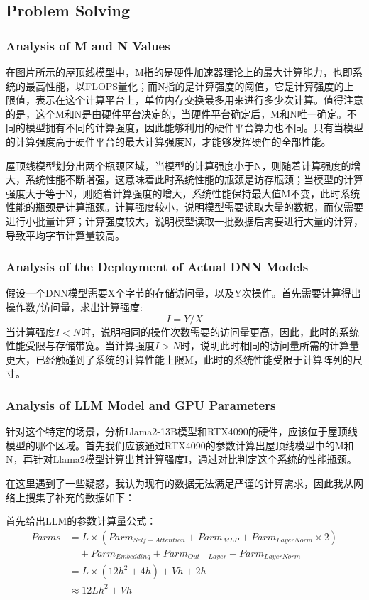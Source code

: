 \documentclass[11pt, a4 paper]{article}
\begin{document}
\subsection{Problem Solving}
\subsubsection{Analysis of M and N Values}
在图片所示的屋顶线模型中，M指的是硬件加速器理论上的最大计算能力，也即系统的最高性能，以FLOPS量化；而N指的是计算强度的阈值，它是计算强度的上限值，表示在这个计算平台上，单位内存交换最多用来进行多少次计算。值得注意的是，这个M和N是由硬件平台决定的，当硬件平台确定后，M和N唯一确定。不同的模型拥有不同的计算强度，因此能够利用的硬件平台算力也不同。只有当模型的计算强度高于硬件平台的最大计算强度N，才能够发挥硬件的全部性能。

屋顶线模型划分出两个瓶颈区域，当模型的计算强度小于N，则随着计算强度的增大，系统性能不断增强，这意味着此时系统性能的瓶颈是访存瓶颈；当模型的计算强度大于等于N，则随着计算强度的增大，系统性能保持最大值M不变，此时系统性能的瓶颈是计算瓶颈。计算强度较小，说明模型需要读取大量的数据，而仅需要进行小批量计算；计算强度较大，说明模型读取一批数据后需要进行大量的计算，导致平均字节计算量较高。

\subsubsection{Analysis of the Deployment of Actual DNN Models}
假设一个DNN模型需要X个字节的存储访问量，以及Y次操作。首先需要计算得出操作数/访问量，求出计算强度:
$$I = Y/X$$
当计算强度$I < N$时，说明相同的操作次数需要的访问量更高，因此，此时的系统性能受限与存储带宽。当计算强度$I > N$时，说明此时相同的访问量所需的计算量更大，已经触碰到了系统的计算性能上限M，此时的系统性能受限于计算阵列的尺寸。
\subsubsection{Analysis of LLM Model and GPU Parameters}
针对这个特定的场景，分析Llama2-13B模型和RTX4090的硬件，应该位于屋顶线模型的哪个区域。首先我们应该通过RTX4090的参数计算出屋顶线模型中的M和N，再针对Llama2模型计算出其计算强度I，通过对比判定这个系统的性能瓶颈。

在这里遇到了一些疑惑，我认为现有的数据无法满足严谨的计算需求，因此我从网络上搜集了补充的数据如下：

首先给出LLM的参数计算量公式：
\begin{align}
Parms &= L \times (Parm_{Self-Attention} + Parm_{MLP} + Parm_{LayerNorm} \times 2) \nonumber \\
      &\quad + Parm_{Embedding} + Parm_{Out-Layer} + Parm_{LayerNorm} \\
      &= L \times (12h^2 + 4h) + Vh + 2h \\
      &\approx 12Lh^2 + Vh
\end{align}
\end{document}
